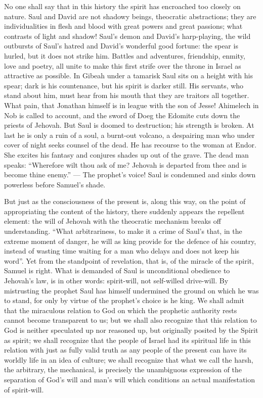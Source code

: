 \documentclass[12pt,a4paper,openany]{book}
\newcommand{\opage}[1]{\marginnote{\footnotesize\textit{[#1]}}}
\begin{document}
No one shall say that in this history the spirit has
encroached too closely on nature. Saul and David are not shadowy
beings, theocratic abstractions; they are
individualities in flesh and blood with great powers and
\setcounter{footnote}{0}%
\opage{34}great passions; what contrasts of light and shadow!
Saul's demon and David's harp-playing, the wild outbursts of
Saul's hatred and David's wonderful good fortune: the spear is hurled,
but it does not strike him. Battles and adventures,
friendship, enmity, love and poetry, all unite
to make this first strife over the throne in Israel
as attractive as possible. In Gibeah under a tamarisk
Saul sits on a height with his spear; dark is
his countenance, but his spirit is darker still. His
servants, who stand about him, must hear from his
mouth that they are traitors all together. What pain,
that Jonathan himself is in league with the son of Jesse! Ahimelech
in Nob is called to account, and the sword of Doeg the Edomite
cuts down the priests of Jehovah. But Saul is doomed to destruction;
his strength is broken. At last he is only a
ruin of a soul, a burnt-out volcano, a despairing man who
under cover of night seeks counsel of the dead. He has recourse
to the woman at Endor. She excites his fantasy and
conjures shades up out of the grave. The dead man speaks: ``Wherefore
wilt thou ask of me? Jehovah is departed from thee and is become
thine enemy.'' --- The prophet's voice! Saul is condemned and
sinks down powerless before Samuel's shade.

But just as the consciousness of the present is, along this way,
on the point of appropriating the content of the history, there suddenly
appears the repellent element: the will of Jehovah with the
theocratic mechanism breaks off understanding. ``What
arbitrariness, to make it a crime of Saul's
that, in the extreme moment of danger, he will as king provide
for the defence of his country, instead of wasting time
waiting for a man who delays and does not keep his
word''. Yet from the standpoint of revelation, that is, of the miracle of the spirit,
Samuel is right. What is demanded of Saul
\setcounter{footnote}{0}%
\opage{35}is unconditional obedience to Jehovah's law, is in other
words: spirit-will, not self-willed drive-will. By
mistrusting the prophet Saul has himself undermined the ground
on which he was to stand, for only by virtue of the prophet's
choice is he king. We shall admit that the miraculous
relation to God on which the prophetic authority rests
cannot become transparent to us; but we shall
also recognize that this relation to God is neither speculated up
nor reasoned up, but originally posited by
the Spirit as spirit; we shall recognize that the people of Israel
had its spiritual life in this relation with just
as fully valid truth as any people of the present can have
its worldly life in an idea of culture; we shall recognize
that what we call the harsh, the arbitrary, the
mechanical, is precisely the unambiguous expression of the
separation of God's will and man's will which conditions
an actual manifestation of spirit-will.
\end{document}
